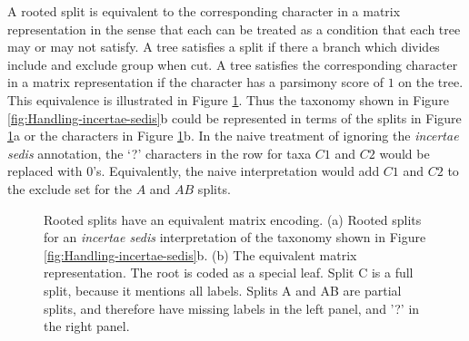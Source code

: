 \documentclass[english]{article}
\begin{document}
A rooted split is equivalent to the corresponding character in a matrix representation in the
sense that each can be treated as a condition that each tree may or may not satisfy.  A tree satisfies
a split if there a branch which divides include and exclude group when cut.  A tree satisfies the
corresponding character in a matrix representation if the character has a parsimony score of $1$ on the tree.  This equivalence is illustrated in Figure \ref{fig:Handling-incertae-sedis-mrp}.  Thus the taxonomy shown in Figure \ref{fig:Handling-incertae-sedis}b could be represented in terms of the splits
in Figure \ref{fig:Handling-incertae-sedis-mrp}a or the characters in Figure \ref{fig:Handling-incertae-sedis-mrp}b.  In the naive treatment of ignoring the \emph{incertae sedis} annotation, the `?' characters in the row for taxa $C1$ and $C2$ would be replaced with 0's.  Equivalently, the naive interpretation would add $C1$ and $C2$ to the exclude set for the $A$ and $AB$ splits.

   \begin{figure}
       \caption{\label{fig:Handling-incertae-sedis-mrp} Rooted splits have an equivalent matrix encoding.
        (a) Rooted splits for an \emph{incertae sedis} interpretation of the taxonomy shown in  Figure \ref{fig:Handling-incertae-sedis}b. (b) The equivalent matrix representation. The root is coded as a special leaf. Split C is a full split, because it mentions all labels.  Splits A and AB are partial splits, and therefore have missing labels in the left panel, and '?' in the right panel.
       }

\end{figure}
\end{document}
